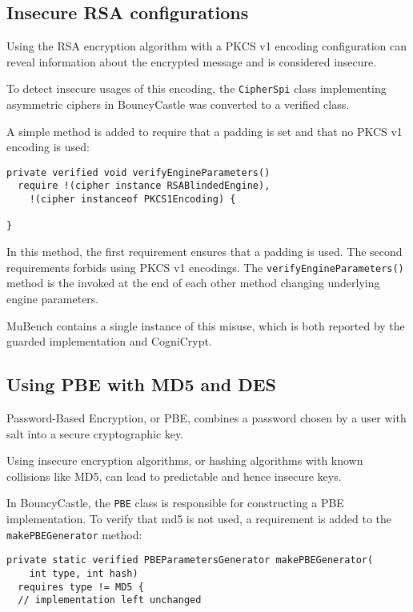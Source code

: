 \documentclass{article}
\begin{document}
\subsection{Insecure RSA configurations}

Using the RSA encryption algorithm with a PKCS v1 encoding configuration can reveal
information about the encrypted message and is considered insecure.

To detect insecure usages of this encoding, the \texttt{CipherSpi} class implementing
asymmetric ciphers in BouncyCastle was converted to a verified class.

A simple method is added to require that a padding is set and that no
PKCS v1 encoding is used:

\begin{lstlisting}[style=jGuard]
private verified void verifyEngineParameters() 
  require !(cipher instance RSABlindedEngine),
    !(cipher instanceof PKCS1Encoding) {

}
\end{lstlisting}

In this method, the first requirement ensures that a padding is used.
The second requirements forbids using PKCS v1 encodings.
The \texttt{verifyEngineParameters()} method is the invoked at the end of each
other method changing underlying engine parameters.

MuBench contains a single instance of this misuse, which is both reported by
the guarded implementation and CogniCrypt.

\subsection{Using PBE with MD5 and DES}

Password-Based Encryption, or PBE, combines a password chosen by a user
with salt into a secure cryptographic key.

Using insecure encryption algorithms, or hashing algorithms with known collisions like MD5,
can lead to predictable and hence insecure keys.

In BouncyCastle, the \texttt{PBE} class is responsible for constructing a PBE implementation.
To verify that md5 is not used, a requirement is added to the \texttt{makePBEGenerator} method:

\begin{lstlisting}[style=jGuard]
private static verified PBEParametersGenerator makePBEGenerator(
    int type, int hash)
  requires type != MD5 {
  // implementation left unchanged
\end{lstlisting}
\end{document}

